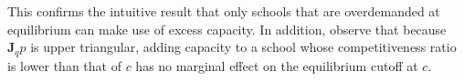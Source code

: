 \documentclass[12pt]{article}
\numberwithin{equation}{subsection}
\theoremstyle{definition}
\begin{document}
This confirms the intuitive result that only schools that are overdemanded at equilibrium can make use of excess capacity. In addition, observe that because $\mathbf{J}_q \hat p$ is upper triangular, adding capacity to a school whose competitiveness ratio is lower than that of $c$ has no marginal effect on the equilibrium cutoff at $c$. 

%

\end{document}
